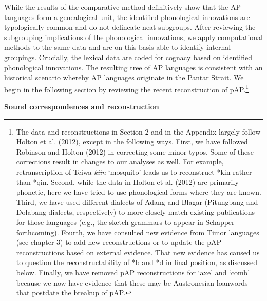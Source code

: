 While the results of the comparative method definitively show that the AP languages form a genealogical unit, the identified phonological innovations are typologically common and do not delineate neat subgroups. After reviewing the subgrouping implications of the phonological innovations, we apply computational methods to the same data and are on this basis able to identify internal groupings. Crucially, the lexical data are coded for cognacy based on identified phonological innovations. The resulting tree of AP languages is consistent with an historical scenario whereby AP languages originate in the Pantar Strait. We begin in the following section by reviewing the recent reconstruction of pAP.\footnote{ The data and reconstructions in Section 2 and in the Appendix largely follow Holton et al. (2012), except in the following ways. First, we have followed Robinson and Holton (2012) in correcting some minor typos. Some of these corrections result in changes to our analyses as well. For example, retranscription 
of Teiwa \textit{ki{\textglotstop}in }{\textquoteleft}mosquito{\textquoteright} leads us to reconstruct *kin rather than *qin. Second, while the data in Holton et al. (2012) are primarily phonetic, here we have tried to use phonological forms where they are known. Third, we have used different dialects of Adang and Blagar (Pitungbang and Dolabang dialects, respectively) to more closely match existing publications for those languages (e.g., the sketch grammars to appear in Schapper forthcoming). Fourth, we have consulted new evidence from Timor languages (see chapter 3) to add new reconstructions or to update the pAP reconstructions based on external evidence. That new evidence has caused us to question the reconstructability of *b and *d in final position, as discussed below. Finally, we have removed pAP reconstructions for {\textquoteleft}axe{\textquoteright} and {\textquoteleft}comb{\textquoteright} because we now have evidence that these may be Austronesian loanwords that postdate the breakup of pAP.} 

{\bfseries
\hypertarget{RefHeading49913871885726}{}\label{bkm:Ref214155962}Sound correspondences and reconstruction}

